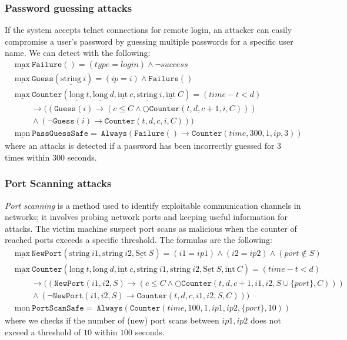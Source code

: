 \documentclass[aspectratio=169,t,xcolor=table]{beamer}
\begin{document}
\begin{frame}
    \frametitle{Password guessing attacks}
    If the system accepts telnet connections for remote login, an attacker can easily compromise a user's password by guessing multiple passwords for a specific user name. We can detect with the following:
    \begin{align*}
        & \underline{\text{max}}\ \mathtt{Failure}() = (type=login)\land \neg success\\
        & \underline{\text{max}}\ \mathtt{Guess}(\underline{\text{string}}\ i) = (ip=i)\land \mathtt{Failure}()\\
        & \underline{\text{max}}\ \mathtt{Counter}(\underline{\text{long}}\ t, \underline{\text{long}}\ d, \underline{\text{int}}\ c,\underline{\text{string}}\ i,\underline{\text{int}}\ C) = (time-t<d)\\
        & \quad\quad\rightarrow((\mathtt{Guess}(i)\rightarrow(c\leq C\land \bigcirc\mathtt{Counter}(t,d,c+1,i,C)))  \\
        & \quad\quad\land(\neg \mathtt{Guess}(i)\rightarrow\mathtt{Counter}(t,d,c,i,C))) \\
        & \underline{\text{mon}}\ \mathtt{PassGuessSafe} =\ \mathtt{Always}(\mathtt{Failure}()\rightarrow\mathtt{Counter}(time,300,1,ip,3)) 
    \end{align*}
    where an attacks is detected if a password has been incorrectly guessed for $3$ times within $300$ seconds.
\end{frame}

\begin{frame}
    \frametitle{Port Scanning attacks}
    \textit{Port scanning} is a method used to identify exploitable communication channels in networks; it involves probing network ports and keeping useful information for attacks. The victim machine suspect port scans as malicious when the counter of reached ports exceeds a specific threshold. The formulas are the following:
    \begin{align*}
        & \underline{\text{max}}\ \mathtt{NewPort}(\underline{\text{string}}\ i1,\underline{\text{string}}\ i2,\underline{\text{Set}}\ S) = (i1=ip1)\land(i2=ip2)\land (port \notin S)\\
        & \underline{\text{max}}\ \mathtt{Counter}(\underline{\text{long}}\ t, \underline{\text{long}}\ d, \underline{\text{int}}\ c,\underline{\text{string}}\ i1,\underline{\text{string}}\ i2,\underline{\text{Set}}\ S,\underline{\text{int}}\ C) = (time-t<d)\\
        & \quad\quad\rightarrow((\mathtt{NewPort}(i1,i2,S)\rightarrow(c\leq C\land \bigcirc\mathtt{Counter}(t,d,c+1,i1,i2,S\cup\{port\},C)))  \\
        & \quad\quad\land(\neg \mathtt{NewPort}(i1,i2,S)\rightarrow\mathtt{Counter}(t,d,c,i1,i2,S,C))) \\
        & \underline{\text{mon}}\ \mathtt{PortScanSafe} =\ \mathtt{Always}(\mathtt{Counter}(time,100,1,ip1,ip2,\{port\},10)) 
    \end{align*}
    where we checks if the number of (new) port scans between $ip1,ip2$ does not exceed a threshold of $10$ within $100$ seconds.
\end{frame}
\end{document}
